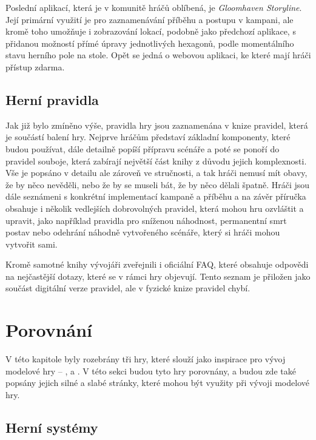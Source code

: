 Poslední aplikací, která je v komunitě hráčů oblíbená, je \textit{Gloomhaven Storyline}. Její primární využití je pro zaznamenávání příběhu a postupu v kampani, ale kromě toho umožňuje i zobrazování lokací, podobně jako předchozí aplikace, s přidanou možností přímé úpravy jednotlivých hexagonů, podle momentálního stavu herního pole na stole. Opět se jedná o webovou aplikaci, ke které mají hráči přístup zdarma.

\subsection{Herní pravidla}
\label{subsec:gh_rules}

Jak již bylo zmíněno výše, pravidla hry jsou zaznamenána v knize pravidel, která je součástí balení hry. Nejprve hráčům představí základní komponenty, které budou používat, dále detailně popíší přípravu scénáře a poté se ponoří do pravidel souboje, která zabírají největší část knihy z důvodu jejich komplexnosti. Vše je popsáno v detailu ale zároveň ve stručnosti, a tak hráči nemusí mít obavy, že by něco nevěděli, nebo že by se museli bát, že by něco dělali špatně. Hráči jsou dále seznámeni s konkrétní implementací kampaně a příběhu a na závěr příručka obsahuje i několik vedlejších dobrovolných pravidel, která mohou hru ozvláštit a upravit, jako například pravidla pro sníženou náhodnost, permanentní smrt postav nebo odehrání náhodně vytvořeného scénáře, který si hráči mohou vytvořit sami.

Kromě samotné knihy vývojáři zveřejnili i oficiální FAQ, které obsahuje odpovědi na nejčastější dotazy, které se v rámci hry objevují. Tento seznam je přiložen jako součást digitální verze pravidel, ale v fyzické knize pravidel chybí.



\section{Porovnání}
\label{sec:comparison}

V této kapitole byly rozebrány tři hry, které slouží jako inspirace pro vývoj modelové hry -- ,  a . V této sekci budou tyto hry porovnány, a budou zde také popsány jejich silné a slabé stránky, které mohou být využity při vývoji modelové hry.

\subsection{Herní systémy}
\label{subsec:comparison_gameplay}

